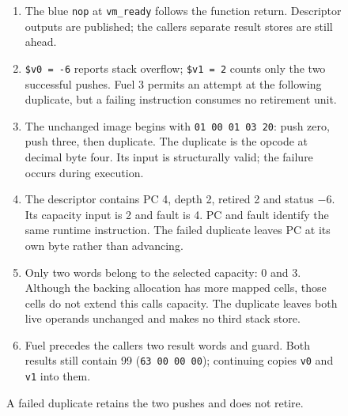 \begin{figure}[htbp]
  \par\smallskip
  \begin{minipage}{\linewidth}
    \small
    \begin{enumerate}
      \setlength{\itemsep}{2pt}
            \setlength{\parsep}{0pt}
      \item The blue \texttt{nop} at \texttt{vm\_ready} follows the function return. Descriptor outputs are published; the caller\textquotesingle s separate result stores are still ahead.
      \item \texttt{\$v0 = -6} reports stack overflow; \texttt{\$v1 = 2} counts only the two successful pushes. Fuel 3 permits an attempt at the following duplicate, but a failing instruction consumes no retirement unit.
      \item The unchanged image begins with \texttt{01 00 01 03 20}: push zero, push three, then duplicate. The duplicate is the opcode at decimal byte four. Its input is structurally valid; the failure occurs during execution.
      \item The descriptor contains PC 4, depth 2, retired 2 and status $-6$. Its capacity input is 2 and fault is 4. PC and fault identify the same runtime instruction. The failed duplicate leaves PC at its own byte rather than advancing.
      \item Only two words belong to the selected capacity: 0 and 3. Although the backing allocation has more mapped cells, those cells do not extend this call\textquotesingle s capacity. The duplicate leaves both live operands unchanged and makes no third stack store.
      \item Fuel precedes the caller\textquotesingle s two result words and guard. Both results still contain 99 (\texttt{63 00 00 00}); continuing copies \texttt{v0} and \texttt{v1} into them.
    \end{enumerate}
  \end{minipage}
  \caption{A failed duplicate retains the two pushes and does not retire.}
  \label{capture:018-tiny-bytecode-interpreter-f03}
  \label{vm-f03}
\end{figure}
\par
